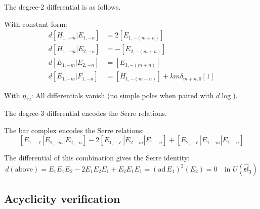 \begin{computation}\label{comp:sl3-bar}
The degree-2 differential is as follows.

With constant form:
\begin{align*}
d[H_{1,-m}|E_{1,-n}] &= 2[E_{1,-(m+n)}] \\
d[H_{1,-m}|E_{2,-n}] &= -[E_{2,-(m+n)}] \\
d[E_{1,-m}|E_{2,-n}] &= [E_{3,-(m+n)}] \\
d[E_{1,-m}|F_{1,-n}] &= [H_{1,-(m+n)}] + km\delta_{m+n,0}[1]
\end{align*}

With $\eta_{12}$: All differentials vanish (no simple poles when paired with $d\log$).

The degree-3 differential encodes the Serre relations.

The bar complex encodes the Serre relations:
\[
[E_{1,-\ell}|E_{1,-m}|E_{2,-n}] - 2[E_{1,-\ell}|E_{2,-m}|E_{1,-n}] + [E_{2,-\ell}|E_{1,-m}|E_{1,-n}]
\]

The differential of this combination gives the Serre identity:
\[
d(\text{above}) = E_1 E_1 E_2 - 2 E_1 E_2 E_1 + E_2 E_1 E_1 = (\text{ad}\, E_1)^2(E_2) = 0 \quad \text{in } U(\hat{\mathfrak{sl}}_3)
\]
\end{computation}


\subsection{Acyclicity verification}

